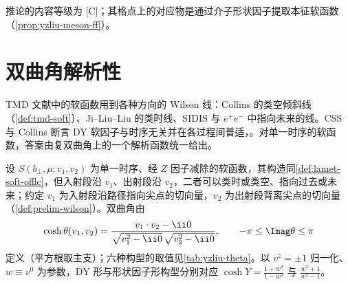 推论的内容等级为 [C]；其格点上的对应物是通过介子形状因子提取本征软函数（\cref{prop:yzliu-meson-ff}）。

\section{双曲角解析性}\label{sec:yzliu-analyticity}

TMD 文献中的软函数用到各种方向的 Wilson 线：Collins 的类空倾斜线（\cref{def:tmd-soft}）、Ji--Liu--Liu 的类时线、SIDIS 与 $e^+e^-$ 中指向未来的线。CSS 与 Collins 断言 DY 软因子与时序无关并在各过程间普适\cite{CollinsMetz2004}，\cite[第~13~章]{Collins2011}。对单一时序的软函数，答案由复双曲角上的一个解析函数统一给出。

\begin{definition}[双曲角与六种构型]\label{def:yzliu-hyperbolic-angle}
设 $S(b_\perp,\mu;v_1,v_2)$ 为单一时序、经 $Z$ 因子减除的软函数，其构造同\cref{def:lamet-soft-offlc}，但入射段沿 $v_1$、出射段沿 $v_2$，二者可以类时或类空、指向过去或未来\cite[式~(93)]{Liu:2022nnk}；约定 $v_1$ 为入射段沿路径指向尖点的切向量，$v_2$ 为出射段背离尖点的切向量（\cref{def:prelim-wilson}）。双曲角由
\begin{equation}\label{eq:yzliu-theta}
\cosh\theta(v_1,v_2)=\frac{v_1\cdot v_2-\ii0}{\sqrt{v_1^2-\ii0}\,\sqrt{v_2^2-\ii0}},\qquad -\pi\le\Imag\theta\le\pi
\end{equation}
定义（平方根取主支）；六种构型的取值见\cref{tab:yzliu-theta}。以 $v^z=\pm1$ 归一化、$w\equiv v^0$ 为参数，DY 形与形状因子形构型分别对应 $\cosh Y=\frac{1+w^2}{1-w^2}$ 与 $\frac{w^2+1}{w^2-1}$。%
\end{definition}

